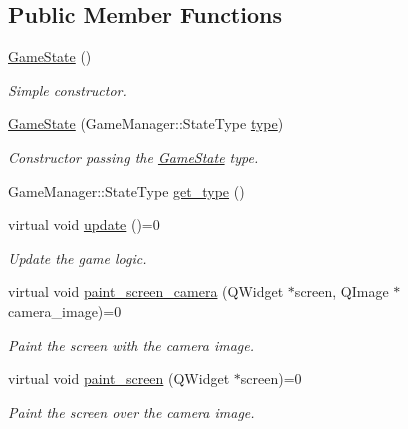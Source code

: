 \subsection*{Public Member Functions}
\begin{DoxyCompactItemize}
\item 
\hyperlink{class_game_state_a4fa0a2bf50315c4a35a3890a0adcee5c}{Game\-State} ()
\begin{DoxyCompactList}\small\item\em Simple constructor. \end{DoxyCompactList}\item 
\hypertarget{class_game_state_a428a39433507456ddd6304c07ec80075}{\hyperlink{class_game_state_a428a39433507456ddd6304c07ec80075}{Game\-State} (Game\-Manager\-::\-State\-Type \hyperlink{class_game_state_afc2d4395529e7ecba05379a8f5f224c5}{type})}\label{class_game_state_a428a39433507456ddd6304c07ec80075}

\begin{DoxyCompactList}\small\item\em Constructor passing the \hyperlink{class_game_state}{Game\-State} type. \end{DoxyCompactList}\item 
Game\-Manager\-::\-State\-Type \hyperlink{class_game_state_ae04e587d59e6f2cba6dddd95faabc734}{get\-\_\-type} ()
\item 
virtual void \hyperlink{class_game_state_ab2864bfa04f92f6966861a1f2883bda0}{update} ()=0
\begin{DoxyCompactList}\small\item\em Update the game logic. \end{DoxyCompactList}\item 
virtual void \hyperlink{class_game_state_aac32d423dd6ebe9c1dbbf4c02b1b8d61}{paint\-\_\-screen\-\_\-camera} (Q\-Widget $\ast$screen, Q\-Image $\ast$camera\-\_\-image)=0
\begin{DoxyCompactList}\small\item\em Paint the screen with the camera image. \end{DoxyCompactList}\item 
virtual void \hyperlink{class_game_state_a3ea5432d8db8538bc18ab4cf0fdfc871}{paint\-\_\-screen} (Q\-Widget $\ast$screen)=0
\begin{DoxyCompactList}\small\item\em Paint the screen over the camera image. \end{DoxyCompactList}\end{DoxyCompactItemize}
